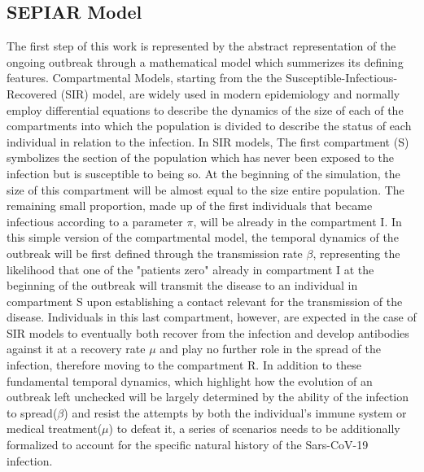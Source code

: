 \documentclass[../main.tex]{subfiles}
\begin{document}
\subsection{SEPIAR Model}
\label{sec: SEPIAR}

The first step of this work is represented by the abstract representation of the ongoing outbreak through a mathematical model which summerizes its defining features.  Compartmental Models, starting from the the Susceptible-Infectious-Recovered (SIR) model, are widely used in modern epidemiology and normally employ differential equations to describe the dynamics of the size of each of the compartments into which the population is divided to describe the status of each individual in relation to the infection.
In SIR models, The first compartment (S) symbolizes the section of the population which has never been exposed to the infection but is susceptible to being so. At the beginning of the simulation, the size of this compartment will be almost equal to the size entire population. The remaining small proportion, made up of the first individuals that became infectious according to a parameter $\pi$, will be already in the compartment I. In this simple version of the compartmental model, the temporal dynamics of the outbreak will be first defined through the transmission rate $\beta$, representing the likelihood that one of the "patients zero" already in compartment I at the beginning of the outbreak will transmit the disease to an individual in compartment S upon establishing a contact relevant for the transmission of the disease. Individuals in this last compartment, however, are  expected in the case of SIR models to eventually both recover from the infection and develop antibodies against it at a recovery rate $\mu$ and play no further role in the spread of the infection, therefore moving to the compartment R.
In addition to these fundamental temporal dynamics, which highlight how the evolution of an outbreak left unchecked will be largely determined by the ability of the infection to spread($\beta$) and resist the attempts by both the individual's immune system or medical treatment($\mu$) to defeat it, a series of scenarios needs to be additionally formalized to account for the specific natural history of the Sars-CoV-19 infection.
\end{document}
